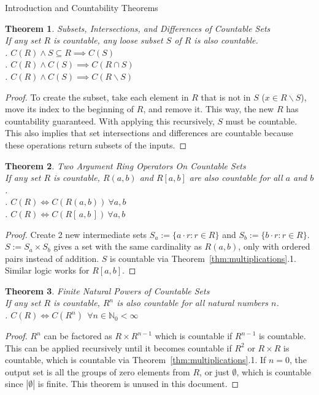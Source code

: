 \documentclass[12pt]{article}
\newtheorem{thm}{Theorem}
\begin{document}
\begin{section}{Introduction and Countability Theorems}
	\begin{thm}\label{thm:subsets}
		\emph{
			Subsets, Intersections, and Differences of Countable Sets\\
			\indent If any set $R$ is countable, any loose subset $S$ of $R$ is also countable.
			\vspace{0.4em}\\
			. $C(R)\land S\subseteq R\implies C(S)$\\
			. $C(R)\land C(S)\implies C(R\cap S)$\\
			. $C(R)\land C(S)\implies C(R\smallsetminus S)$
		}
	\end{thm}\begin{proof}
		To create the subset, take each element in $R$ that is not in $S$ ($x\in R\smallsetminus S$),
		move its index to the beginning of $R$, and remove it. This way, the new $R$ has countability
		guaranteed. With applying this recursively, $S$ must be countable. This also implies that set
		intersections and differences are countable because these operations return subsets of the
		inputs.
	\end{proof}

	\begin{thm}\label{thm:rings}
		\emph{
			Two Argument Ring Operators On Countable Sets\\
			\indent If any set $R$ is countable, $R(a, b)$ and $R[a, b]$ are also countable
			for all $a$ and $b$.\vspace{0.4em}\\
			. $C(R)\iff C(R(a, b))~\forall a,b$\\
			. $C(R)\iff C(R[\,a, b\,])~\forall a,b$
		}
	\end{thm}\begin{proof}
		Create 2 new intermediate sets $S_a := \{a\cdot r:r\in R\}$ and $S_b := \{b\cdot r:r\in R\}$.
		$S:=S_a\times S_b$ gives a set with the same cardinality as $R(a,b)$, only with
		ordered pairs instead of addition. $S$ is countable via Theorem~\ref{thm:multiplications}.1.
		Similar logic works for $R[a,b]$.
	\end{proof}

	\begin{thm}\label{thm:powers}
		\emph{
			Finite Natural Powers of Countable Sets\\
			\indent If any set $R$ is countable, $R^n$ is also countable for all natural
			numbers $n$.\vspace{0.4em}\\
			. $C(R)\iff C(R^n)~~\forall n\in\mathbb N_0<\infty$
		}
	\end{thm}\begin{proof}
		$R^n$ can be factored as $R\times R^{n-1}$ which is countable if $R^{n-1}$ is countable. This can be applied recursively until it becomes countable if $R^2$ or $R\times R$ is
		countable, which is countable via Theorem~\ref{thm:multiplications}.1. If $n=0$, the
		output set is all the groups of zero elements from $R$, or just $\emptyset$, which is countable
		since $\left|\emptyset\right|$ is finite. This theorem is unused in this document.
	\end{proof}


\end{section}
\end{document}
